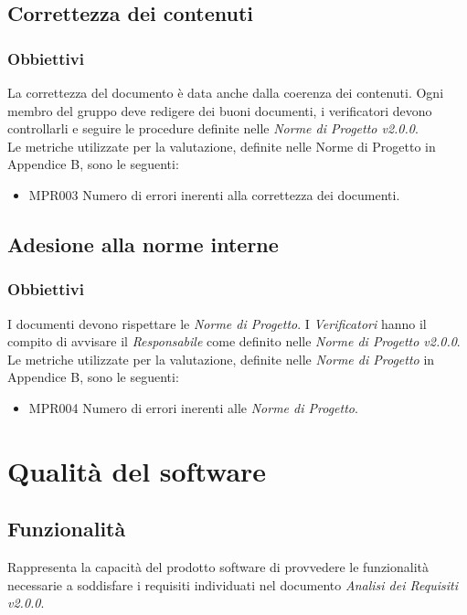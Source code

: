 \subsection{Correttezza dei contenuti}
\subsubsection{Obbiettivi}
La correttezza del documento è data anche dalla coerenza dei contenuti. Ogni membro del gruppo deve redigere dei buoni documenti, i verificatori devono controllarli e seguire le procedure definite nelle \textit{Norme di Progetto v2.0.0}.\\
Le metriche utilizzate per la valutazione, definite nelle Norme di Progetto in Appendice B, sono le seguenti:
\begin{itemize}
	\item MPR003 Numero di errori inerenti alla correttezza dei documenti.
\end{itemize}
\subsection{Adesione alla norme interne}
\subsubsection{Obbiettivi}
I documenti devono rispettare le \textit{Norme di Progetto}. I \textit{Verificatori} hanno il compito di avvisare il \textit{Responsabile} come definito nelle \textit{Norme di Progetto v2.0.0}.\\
Le metriche utilizzate per la valutazione, definite nelle \textit{Norme di Progetto} in Appendice B, sono le seguenti:
\begin{itemize}
	\item MPR004 Numero di errori inerenti alle \textit{Norme di Progetto}.
\end{itemize}

\section{Qualità del software}
\label{software}

\subsection{Funzionalità}
Rappresenta la capacità del prodotto software di provvedere le funzionalità necessarie a soddisfare i requisiti individuati nel documento \textit{Analisi dei Requisiti v2.0.0}. 
